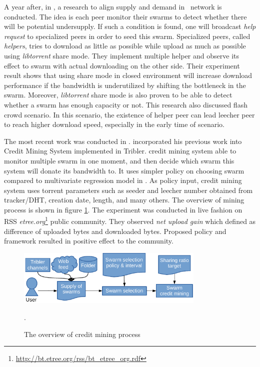 A year after, in \citeyear{2014:bwmarket:capota}, a research to align supply and demand in \bt~network is conducted. The idea is each peer monitor their swarms to detect whether there will be potential undersupply. If such a condition is found, one will broadcast \textit{help request} to specialized peers in order to seed this swarm. Specialized peers, called \textit{helpers}, tries to download as little as possible while upload as much as possible using \textit{libtorrent} share mode. They implement multiple helper and observe its effect to swarm with actual downloading on the other side. Their experiment result shows that using share mode in closed environment will increase download performance if the bandwidth is underutilized \cite{2014:bwmarket:capota} by shifting the bottleneck in the swarm. Moreover, \textit{libtorrent} share mode is also proven to be able to detect whether a swarm has enough capacity or not. This research also discussed flash crowd scenario. In this scenario, the existence of helper peer can lead leecher peer to reach higher download speed, especially in the early time of scenario. 

The most recent work was conducted in \citeyear{2015:creditmining:capota}\cite{2015:creditmining:capota}. \citeauthor{2015:creditmining:capota} incorporated his previous work into Credit Mining System implemented in Tribler. credit mining system able to monitor multiple swarm in one moment, and then decide which swarm this system will donate its bandwidth to. It uses simpler policy on choosing swarm compared to multivariate regression model in \cite{2013:investmentcm:capota}. As policy input, credit mining system uses torrent parameters such as seeder and leecher number obtained from tracker/DHT, creation date, length, and many others. The overview of mining process is shown in figure \ref{fig:cm15}. The experiment was conducted in live fashion on RSS \textit{etree.org}\footnote{\url{http://bt.etree.org/rss/bt\_etree\_org.rdf}} public community. They observed \textit{net upload gain} which defined as difference of uploaded bytes and downloaded bytes. Proposed policy and framework resulted in positive effect to the community.

\begin{figure}[ht]
	\centering
	\includegraphics[width=0.8\textwidth]{pics/creditmining2015.pdf}
	\caption{The overview of credit mining process \cite{2015:creditmining:capota}}.
	\label{fig:cm15}
\end{figure}

